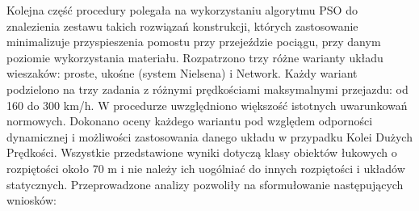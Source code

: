 Kolejna część procedury polegała na wykorzystaniu algorytmu PSO do znalezienia zestawu takich rozwiązań konstrukcji, których zastosowanie minimalizuje przyspieszenia pomostu przy przejeździe pociągu, przy danym poziomie wykorzystania materiału. Rozpatrzono trzy różne warianty układu wieszaków: proste, ukośne (system Nielsena) i Network. Każdy wariant podzielono na trzy zadania z różnymi prędkościami maksymalnymi przejazdu: od 160 do 300 km/h. W procedurze uwzględniono większość istotnych uwarunkowań normowych.
Dokonano oceny każdego wariantu pod względem odporności dynamicznej i możliwości zastosowania danego układu w przypadku Kolei Dużych Prędkości. Wszystkie przedstawione wyniki dotyczą klasy obiektów łukowych o rozpiętości około 70 m i nie należy ich uogólniać do innych rozpiętości i układów statycznych. Przeprowadzone analizy pozwoliły na sformułowanie następujących wniosków:
